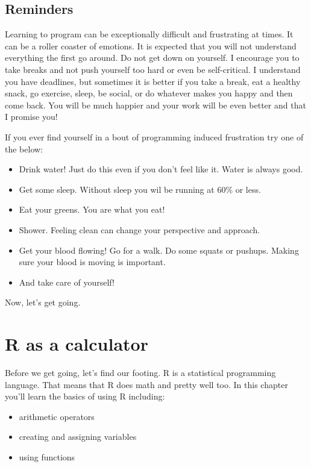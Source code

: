 \documentclass[
]{book}
\providecommand{\tightlist}{%
  \setlength{\itemsep}{0pt}\setlength{\parskip}{0pt}}
\begin{document}
\hypertarget{reminders}{%
\section{Reminders}\label{reminders}}

Learning to program can be exceptionally difficult and frustrating at times. It can be a roller coaster of emotions. It is expected that you will not understand everything the first go around. Do not get down on yourself. I encourage you to take breaks and not push yourself too hard or even be self-critical. I understand you have deadlines, but sometimes it is better if you take a break, eat a healthy snack, go exercise, sleep, be social, or do whatever makes you happy and then come back. You will be much happier and your work will be even better and that I promise you!

If you ever find yourself in a bout of programming induced frustration try one of the below:

\begin{itemize}
\tightlist
\item
  Drink water! Just do this even if you don't feel like it. Water is always good.
\item
  Get some sleep. Without sleep you wil be running at 60\% or less.
\item
  Eat your greens. You are what you eat!
\item
  Shower. Feeling clean can change your perspective and approach.
\item
  Get your blood flowing! Go for a walk. Do some squats or pushups. Making sure your blood is moving is important.
\item
  And take care of yourself!
\end{itemize}

Now, let's get going.

\hypertarget{r-as-a-calculator}{%
\chapter{R as a calculator}\label{r-as-a-calculator}}

Before we get going, let's find our footing. R is a statistical programming language. That means that R does math and pretty well too. In this chapter you'll learn the basics of using R including:

\begin{itemize}
\tightlist
\item
  arithmetic operators
\item
  creating and assigning variables
\item
  using functions
\end{itemize}
\end{document}
